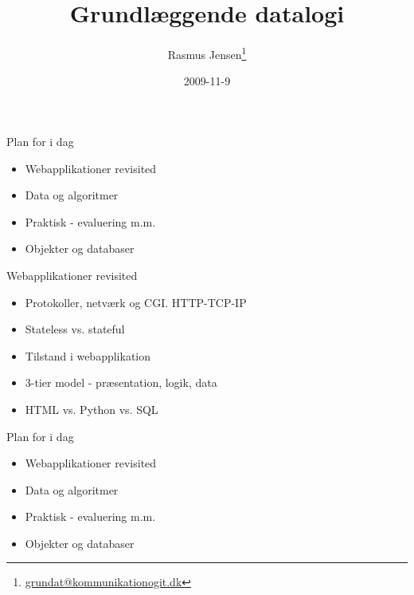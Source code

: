 \documentclass[a4paper,landscape]{slides}
\title{Grundlæggende datalogi}
\author{Rasmus Jensen\footnote{\url{grundat@kommunikationogit.dk}}}
\date{2009-11-9}
\begin{document}
\maketitle
\begin{slide}
	\begin{center} {\large 
            Plan for i dag
	} \end{center}
	\begin{itemize} \addtolength{\itemsep}{-\baselineskip}
            \item Webapplikationer revisited
            \item Data og algoritmer
            \item Praktisk - evaluering m.m.
            \item Objekter og databaser
	\end{itemize}
\end{slide}

\begin{slide}
	\begin{center} {\large 
            Webapplikationer revisited
	} \end{center}
	\begin{itemize} \addtolength{\itemsep}{-\baselineskip}
                \item Protokoller, netværk og CGI. HTTP-TCP-IP
                \item Stateless vs. stateful
                \item Tilstand i webapplikation
                \item 3-tier model - præsentation, logik, data 
                \item HTML vs. Python vs. SQL 
	\end{itemize}
\end{slide}

\begin{slide}
	\begin{center} {\large 
            Plan for i dag
	} \end{center}
	\begin{itemize} \addtolength{\itemsep}{-\baselineskip}
            \item Webapplikationer revisited
            \item Data og algoritmer
            \item Praktisk - evaluering m.m.
            \item Objekter og databaser
	\end{itemize}
\end{slide}
\end{document}
